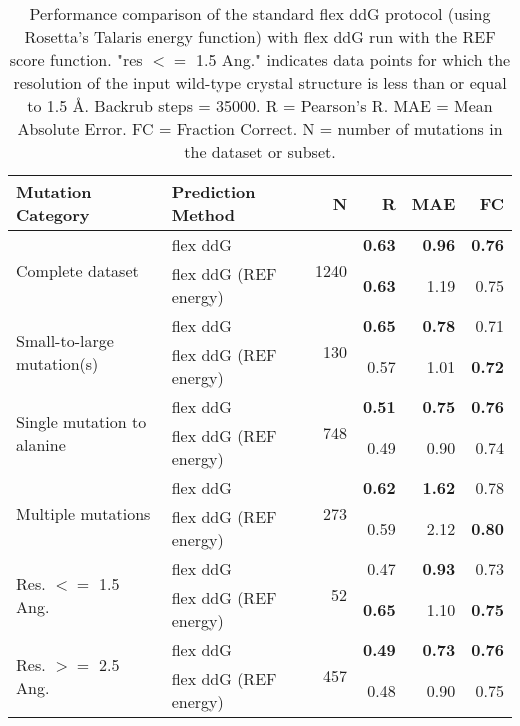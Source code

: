 \begin{table}
  \begin{tabular}{llrrrr}
\toprule
Mutation Category &      Prediction Method &     N &    R &  MAE &   FC \\
\midrule
 \multirow{ 2}{*}{Complete dataset} & flex ddG & \multirow{ 2}{*}{1240} & \textbf{0.63} & \textbf{0.96} & \textbf{0.76}  \\
 & flex ddG (REF energy) & & \textbf{0.63} & 1.19 & 0.75  \\
\hline
 \multirow{ 2}{*}{Small-to-large mutation(s)} & flex ddG & \multirow{ 2}{*}{130} & \textbf{0.65} & \textbf{0.78} & 0.71  \\
 & flex ddG (REF energy) & & 0.57 & 1.01 & \textbf{0.72}  \\
\hline
 \multirow{ 2}{*}{Single mutation to alanine} & flex ddG & \multirow{ 2}{*}{748} & \textbf{0.51} & \textbf{0.75} & \textbf{0.76}  \\
 & flex ddG (REF energy) & & 0.49 & 0.90 & 0.74  \\
\hline
 \multirow{ 2}{*}{Multiple mutations} & flex ddG & \multirow{ 2}{*}{273} & \textbf{0.62} & \textbf{1.62} & 0.78  \\
 & flex ddG (REF energy) & & 0.59 & 2.12 & \textbf{0.80}  \\
\hline
 \multirow{ 2}{*}{Res. $<=$ 1.5 Ang.} & flex ddG & \multirow{ 2}{*}{52} & 0.47 & \textbf{0.93} & 0.73  \\
 & flex ddG (REF energy) & & \textbf{0.65} & 1.10 & \textbf{0.75}  \\
\hline
 \multirow{ 2}{*}{Res. $>=$ 2.5 Ang.} & flex ddG & \multirow{ 2}{*}{457} & \textbf{0.49} & \textbf{0.73} & \textbf{0.76}  \\
 & flex ddG (REF energy) & & 0.48 & 0.90 & 0.75  \\
\bottomrule
\end{tabular}
  \caption[REF results]{
    Performance comparison of the standard flex ddG protocol (using Rosetta's Talaris energy function) with flex ddG run with the REF score function. "res $<=$ 1.5 Ang." indicates data points for which the resolution of the input wild-type crystal structure is less than or equal to 1.5 \AA. Backrub steps = 35000. R = Pearson's R. MAE = Mean Absolute Error. FC = Fraction Correct. N = number of mutations in the dataset or subset.
  } \label{tab:table-ref}
\end{table}

